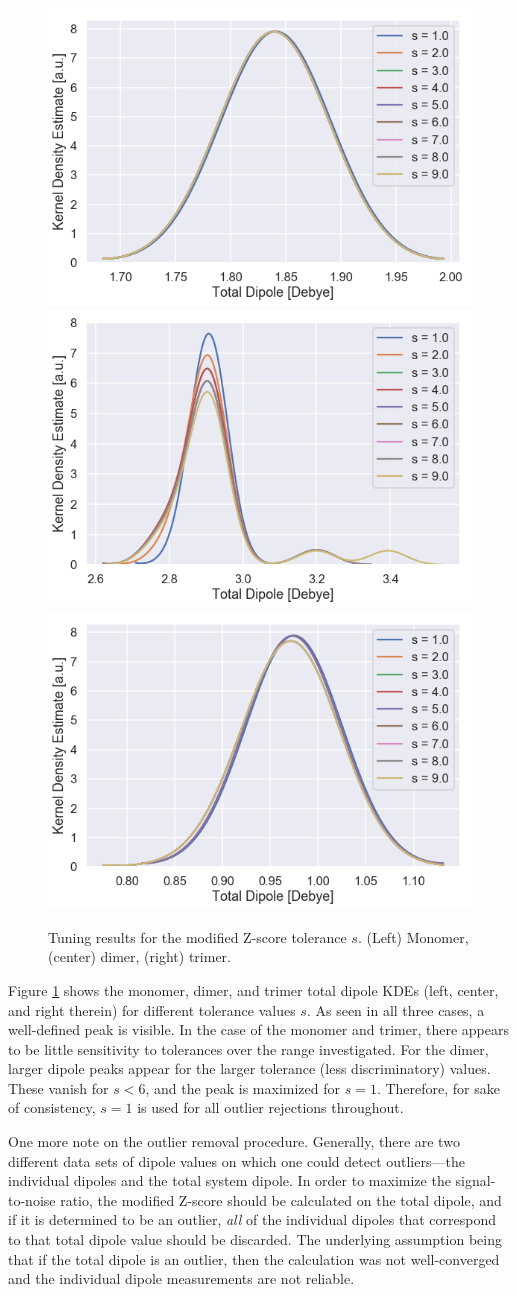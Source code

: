         
        
        \begin{figure}
            \centering
            \includegraphics[width=0.3\linewidth]{Figures/System/pc_m_scan_monomer.png}\hfill
            \includegraphics[width=0.3\linewidth]{Figures/System/pc_m_scan_dimer.png}\hfill
            \includegraphics[width=0.3\linewidth]{Figures/System/pc_m_scan_trimer.png}\hfill
            \caption{Tuning results for the modified Z-score tolerance $s$. (Left) Monomer, (center) dimer, (right) trimer.}
            \label{fig:m_scan}
        \end{figure}
        
        Figure \ref{fig:m_scan} shows the monomer, dimer, and trimer total dipole KDEs (left, center, and right therein) for different tolerance values $s$. As seen in all three cases, a well-defined peak is visible. In the case of the monomer and trimer, there appears to be little sensitivity to tolerances over the range investigated. For the dimer, larger dipole peaks appear for the larger tolerance (less discriminatory) values. These vanish for $s<6$, and the peak is maximized for $s=1$. Therefore, for sake of consistency, $s=1$ is used for all outlier rejections throughout.
        
        One more note on the outlier removal procedure. Generally, there are two different data sets of dipole values on which one could detect outliers---the individual dipoles and the total system dipole. In order to maximize the signal-to-noise ratio, the modified Z-score should be calculated on the total dipole, and if it is determined to be an outlier, \textit{all} of the individual dipoles that correspond to that total dipole value should be discarded. The underlying assumption being that if the total dipole is an outlier, then the calculation was not well-converged and the individual dipole measurements are not reliable.
        
